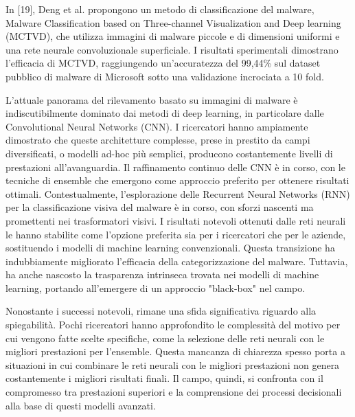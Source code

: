 In [19], Deng et al. propongono un metodo di classificazione del malware, Malware Classification based on Three-channel Visualization and Deep learning (MCTVD), che utilizza immagini di malware piccole e di dimensioni uniformi e una rete neurale convoluzionale superficiale. I risultati sperimentali dimostrano l'efficacia di MCTVD, raggiungendo un'accuratezza del 99,44\% sul dataset pubblico di malware di Microsoft sotto una validazione incrociata a 10 fold.

L'attuale panorama del rilevamento basato su immagini di malware è indiscutibilmente dominato dai metodi di deep learning, in particolare dalle Convolutional Neural Networks (CNN). I ricercatori hanno ampiamente dimostrato che queste architetture complesse, prese in prestito da campi diversificati, o modelli ad-hoc più semplici, producono costantemente livelli di prestazioni all'avanguardia. Il raffinamento continuo delle CNN è in corso, con le tecniche di ensemble che emergono come approccio preferito per ottenere risultati ottimali. Contestualmente, l'esplorazione delle Recurrent Neural Networks (RNN) per la classificazione visiva del malware è in corso, con sforzi nascenti ma promettenti nei trasformatori visivi. I risultati notevoli ottenuti dalle reti neurali le hanno stabilite come l'opzione preferita sia per i ricercatori che per le aziende, sostituendo i modelli di machine learning convenzionali. Questa transizione ha indubbiamente migliorato l'efficacia della categorizzazione del malware. Tuttavia, ha anche nascosto la trasparenza intrinseca trovata nei modelli di machine learning, portando all'emergere di un approccio "black-box" nel campo.

Nonostante i successi notevoli, rimane una sfida significativa riguardo alla spiegabilità. Pochi ricercatori hanno approfondito le complessità del motivo per cui vengono fatte scelte specifiche, come la selezione delle reti neurali con le migliori prestazioni per l'ensemble. Questa mancanza di chiarezza spesso porta a situazioni in cui combinare le reti neurali con le migliori prestazioni non genera costantemente i migliori risultati finali. Il campo, quindi, si confronta con il compromesso tra prestazioni superiori e la comprensione dei processi decisionali alla base di questi modelli avanzati.

